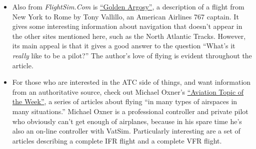 \begin{itemize}
%
%

%
%

%
%

\item Also from \textit{FlightSim.Com} is
  \href{http://www.flightsim.com/vbfs/content.php?1756}{``Golden
    Argosy''}, a description of a flight from New York to Rome by Tony
  Vallillo, an American Airlines 767 captain.  It gives some
  interesting information about navigation that doesn't appear in the
  other sites mentioned here, such as the North Atlantic Tracks.
  However, its main appeal is that it gives a good answer to the
  question ``What's it \emph{really} like to be a pilot?''  The
  author's love of flying is evident throughout the article.

\item For those who are interested in the ATC side of things, and want
  information from an authoritative source, check out Michael Oxner's
  \href{http://bathursted.ccnb.nb.ca/vatcan/fir/moncton/WeeklyTopics/WeeklyTopicIntro.html}{``Aviation
    Topic of the Week''}, a series of articles about flying ``in many
  types of airspaces in many situations.''  Michael Oxner is a
  professional controller and private pilot who obviously can't get
  enough of airplanes, because in his spare time he's also an on-line
  controller with VatSim.  Particularly interesting are a set of
  articles describing a complete IFR flight and a complete VFR flight.





\end{itemize}
\fi
